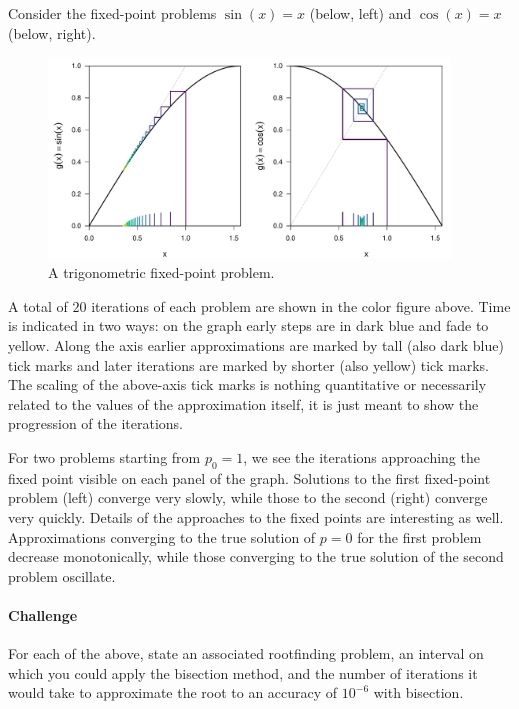 \documentclass[11pt]{article}
\begin{document}

Consider the fixed-point problems \(\sin(x) = x\) (below, left) and \(\cos(x) = x\) (below, right).
%
\begin{figure}[hb!]\centering
\includegraphics[width=0.95\textwidth]{1_basics/fixpt_trig.pdf}
\caption{A trigonometric fixed-point problem.}\label{fig::trigfpp}
\end{figure}

A total of \(20\) iterations of each problem are shown in the color figure above. Time is indicated in two ways: on the graph early steps are in dark blue and fade to yellow. Along the axis earlier approximations are marked by tall (also dark blue) tick marks and later iterations are marked by shorter (also yellow) tick marks. The scaling of the above-axis tick marks is nothing quantitative or necessarily related to the values of the approximation itself, it is just meant to show the progression of the iterations.

For two problems starting from \(p_0=1\), we see the iterations approaching the fixed point visible on each panel of the graph. Solutions to the first fixed-point problem (left) converge very slowly, while those to the second (right) converge very quickly. Details of the approaches to the fixed points are interesting as well. Approximations converging to the true solution of \(p=0\) for the first problem decrease monotonically, while those converging to the true solution of the second problem oscillate.

\paragraph{Challenge} For each of the above, state an associated rootfinding problem, an interval on which you could apply the bisection method, and the number of iterations it would take to approximate the root to an accuracy of \(10^{-6}\) with bisection.
\end{document}
